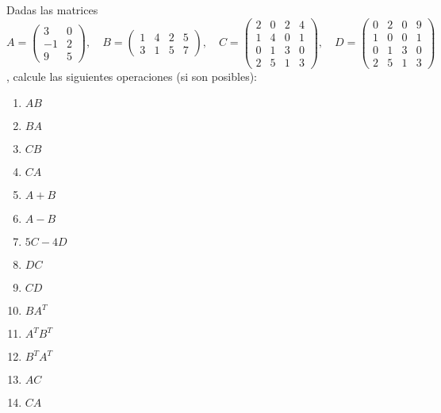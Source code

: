 \begin{prob}
Dadas las matrices \( A = \begin{pmatrix} 3 & 0 \\ -1 & 2 \\ 9 & 5 \end{pmatrix},\quad 
B = \begin{pmatrix} 1 & 4 & 2 & 5 \\ 3 & 1 & 5 & 7 \end{pmatrix},\quad 
C = \begin{pmatrix} 2 & 0 & 2 & 4 \\ 1 & 4 & 0 & 1 \\ 0 & 1 & 3 & 0 \\ 2 & 5 & 1 & 3 \end{pmatrix},\quad 
D = \begin{pmatrix} 0 & 2 & 0 & 9 \\ 1 & 0 & 0 & 1 \\ 0 & 1 & 3 & 0 \\ 2 & 5 & 1 & 3 \end{pmatrix}
\), calcule las siguientes operaciones (si son posibles):
\begin{multicols}{7}
\begin{enumerate}[$(a)$]
    \item $AB$
    \item $BA$
    \item $CB$
    \item $CA$
    \item $A + B$
    \item $A - B$
    \item $5C - 4D$
    \item $DC$
    \item $CD$
    \item $BA^T$
    \item $A^TB^T$
    \item $B^TA^T$
    \item $AC$
    \item $CA$
\end{enumerate}
\end{multicols}


\end{prob}
